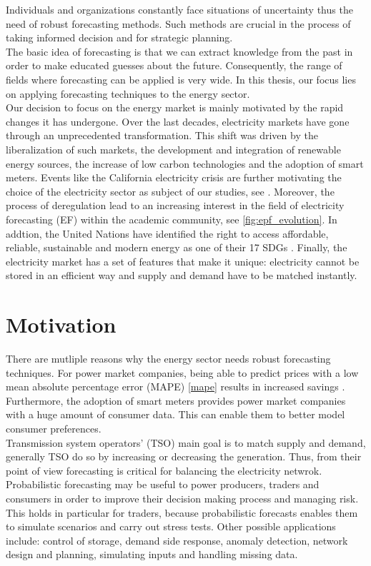 Individuals and organizations constantly face situations of uncertainty thus the need of robust forecasting methods. Such methods are crucial in the process of taking informed decision and for strategic planning.
\\
The basic idea of forecasting is that we can extract knowledge from the past in order to make educated guesses about the future. Consequently, the range of fields where forecasting can be applied is very wide.
In this thesis, our focus lies on applying forecasting techniques to the energy sector. 
\\
Our decision to focus on the energy market is mainly motivated by the rapid changes it has undergone. %
Over the last decades, electricity markets have gone through an unprecedented transformation. This shift was driven by the liberalization of such markets, the development and integration of renewable energy sources, the  increase of low carbon technologies and the adoption of smart meters. Events like the California electricity crisis are further motivating the choice of the electricity sector as subject of our studies, see \cite{california}.
Moreover, the process of deregulation lead to an increasing interest in the field of electricity forecasting (EF) within the academic community, see \ref{fig:epf_evolution}.
In addtion, the United Nations have identified the right to access affordable, reliable, sustainable and modern energy as one of their 17 SDGs \cite{un_sdgs}.
Finally, the electricity market has a set of features that make it unique: electricity cannot be stored in an efficient way and supply and demand have to be matched instantly.
\\
\section{Motivation}
There are mutliple reasons why the energy sector needs robust forecasting techniques.
For power market companies, being able to predict prices with a low mean absolute percentage error (MAPE) \ref{mape} results in increased savings \cite{savings}. Furthermore, the adoption of smart meters provides power market companies with a huge amount of consumer data. This can enable them to better model consumer preferences.
\\
Transmission system operators' (TSO) main goal is to match supply and demand, generally TSO do so by increasing or decreasing the generation. Thus, from their point of view forecasting is critical for balancing the electricity netwrok.
Probabilistic forecasting may be useful to power producers, traders and consumers in order to improve their decision making process and managing risk. This holds in particular for traders, because probabilistic forecasts enables them to simulate scenarios and carry out stress tests.
Other possible applications include: control of storage, demand side response, anomaly detection, network design and planning, simulating inputs and handling missing data.
\\
